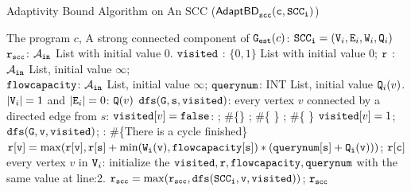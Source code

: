 {\footnotesize
\begin{algorithm}
            \caption{
            {\small Adaptivity Bound Algorithm on An SCC ({$\mathtt{\mathsf{AdaptBD}_{scc}(c, SCC_i)}$})}
            \label{alg:adaptscc}
            }
            \begin{algorithmic}[1]
              \REQUIRE The program $c$, 
              A strong connected component of $\mathtt{{G_{est}}}(c)$: $ \mathtt{SCC_i} = (\mathtt{V}_i, \mathtt{E}_i, \mathtt{W}_i, \mathtt{Q}_i)$
            $\mathtt{r_{scc}}$: $\mathcal{A}_{\mathtt{in}}$ List with initial value $0$.
            $\mathtt{visited}$ : $\{0, 1\}$ List with initial value $0$;
            $\mathtt{r}$ : $\mathcal{A}_{\mathtt{in}}$ List, initial value $\infty$;
            \\ \qquad  
            $\mathtt{flowcapacity}$: $\mathcal{A}_{\mathtt{in}}$ List, initial value $\infty$;
            $\mathtt{querynum}$: INT List, initial value $\mathtt{Q}_i(v)$.
             $|\mathtt{V}_i| = 1$ and $|\mathtt{E}_i| = 0$:
              $\mathtt{Q}(v)$
             {$\mathtt{dfs(G,s,visited)}$}:
            \STATE {} every vertex $v$ 
            connected by a directed edge from $s$:
            \STATE \qquad {} $\mathtt{visited}[v] = \mathtt{false}$:
            \STATE \qquad \qquad {}; \qquad \qquad \#\{\}
            \STATE \qquad \qquad {}; \qquad \qquad \qquad \qquad\#\{ \}
            \STATE \qquad \qquad {}; \#\{ \}
            \STATE \qquad \qquad \qquad  $\mathtt{visited}[v] = 1$; %
            \quad $\mathtt{dfs(G, v, visited)}$;
            \STATE \qquad {}: \#\{There is a cycle finished\}
            \STATE \qquad \qquad \qquad 
            {\small{$\mathtt{r[v] =  \max(r[v], r[s] +\min(\mathtt{W}_i(v), {flowcapacity}[s]) * (querynum[s] + \mathtt{Q}_i(v)))}$}};
            \STATE {}  $\mathtt{r[c]}$
             every vertex $v$ in $\mathtt{V}_i$:
            \STATE  \qquad initialize the $\mathtt{visited, r, flowcapacity, querynum}$ with the same value at line:2.
            \STATE  \qquad $\mathtt{r_{scc} = \max(r_{scc}, dfs(SCC_i, v, \mathtt{visited} ))}$;
            \RETURN  $\mathtt{r_{scc}}$
            \end{algorithmic}
            \end{algorithm}
}           

